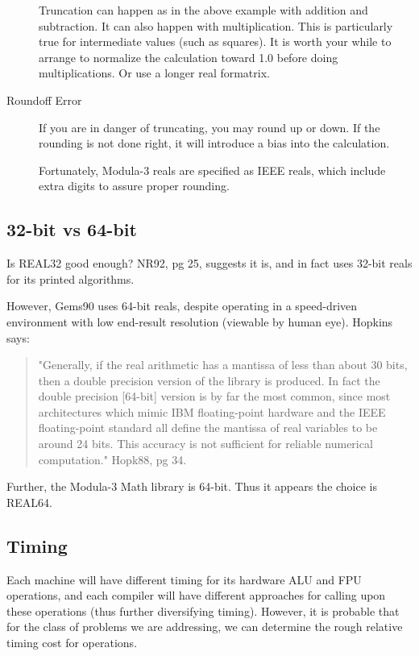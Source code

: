\begin{description}
     Truncation can happen as in the above example with
     addition and subtraction.  It can also happen with
     multiplication.  This is particularly true for
     intermediate values (such as squares).  It is worth
     your while to arrange to normalize the calculation
     toward 1.0 before doing multiplications.  Or use a
     longer real formatrix.

\item[Roundoff Error]
     If you are in danger of truncating, you may round up or
     down.  If the rounding is not done right, it will
     introduce a bias into the calculation.
     
     Fortunately, Modula-3 reals are specified as IEEE
     reals, which include extra digits to assure proper
     rounding.
\end{description}

\subsection{32-bit vs 64-bit}
Is REAL32 good enough?  NR92, pg 25, suggests it is, and in
fact uses 32-bit reals for its printed algorithms.

However, Gems90 uses 64-bit reals, despite operating in a
speed-driven environment with low end-result resolution
(viewable by human eye).  Hopkins says:
\begin{quote}
     "Generally, if the real arithmetic has a mantissa of
     less than about 30 bits, then a double precision
     version of the library is produced.  In fact the double
     precision [64-bit] version is by far the most common,
     since most architectures which mimic IBM floating-point
     hardware and the IEEE floating-point standard all
     define the mantissa of real variables to be around 24
     bits.  This accuracy is not sufficient for reliable
     numerical computation."  Hopk88, pg 34.
\end{quote}

Further, the Modula-3 Math library is 64-bit.  Thus it
appears the choice is REAL64.

\subsection{Timing}
Each machine will have different timing for its hardware
ALU and FPU operations, and each compiler will have
different approaches for calling upon these operations (thus
further diversifying timing).  However, it is probable that
for the class of problems we are addressing, we can
determine the rough relative timing cost for operations.

